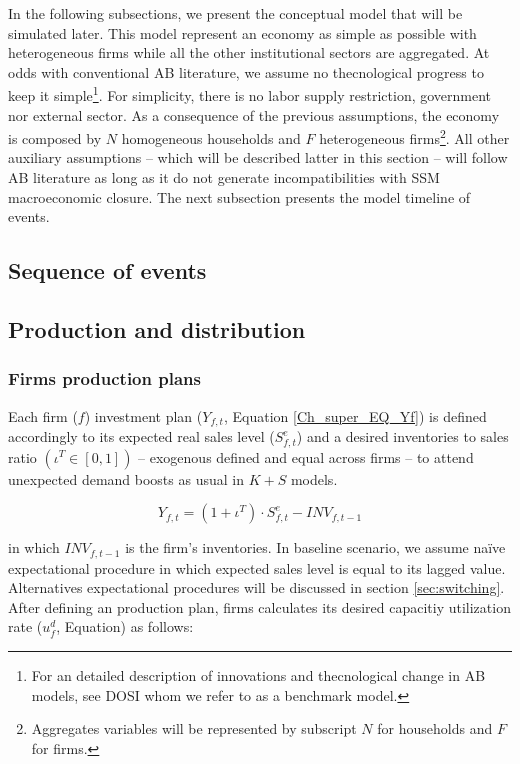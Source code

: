\documentclass{SelfArx}
\begin{document}
In the following subsections, we present the conceptual model that will be simulated later.
This model represent an economy as simple as possible with heterogeneous firms while all the other institutional sectors are aggregated.
At odds with conventional AB literature, we assume no thecnological progress to keep it simple\footnote{For an detailed description of innovations and thecnological change in AB models, see DOSI whom we refer to as a benchmark model.}.
For simplicity, there is no labor supply restriction, government nor external sector.
As a consequence of the previous assumptions, the economy is composed by \(N\) homogeneous households and \(F\) heterogeneous firms\footnote{Aggregates variables will be represented by subscript \(N\) for households and \(F\) for firms.}.
All other auxiliary assumptions -- which will be described latter in this section -- will follow AB literature as long as it do not generate incompatibilities with SSM macroeconomic closure.
The next subsection presents the model timeline of events.

\subsection{Sequence of events}
\label{sec:org95b1dd0}



\subsection{Production and distribution}
\label{sec:org9b2e2e1}


\subsubsection{Firms production plans}
\label{sec:org5acce5a}

Each firm (\(f\)) investment plan (\(Y_{f,t}\), Equation \ref{Ch_super_EQ_Yf}) is defined accordingly to its expected real sales level (\(S^{e}_{f,t}\)) and a desired inventories to sales ratio \((\iota^{T} \in [0,1])\) -- exogenous defined and equal across firms -- to attend unexpected demand boosts as usual in \(K+S\) models.

\begin{latex}
\begin{equation}
\label{Ch_super_EQ_Yf}
Y_{f,t} = (1+\iota^{T})\cdot S^{e}_{f,t} - INV_{f,t-1}
\end{equation}
\end{latex}
in which \(INV_{f,t-1}\) is the firm's inventories.
In baseline scenario, we assume naïve expectational procedure in which expected sales level is equal to its lagged value.
Alternatives expectational procedures will be discussed in section \ref{sec:switching}.
After defining an production plan, firms calculates its desired capacitiy utilization rate (\(u^{d}_{f}\), Equation) as follows:
\end{document}
